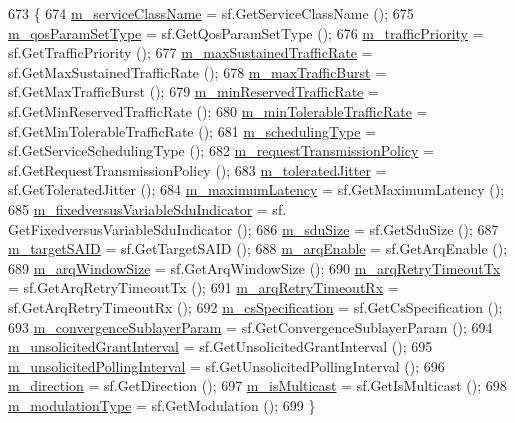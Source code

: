 \begin{DoxyCode}
673 \{
674   \hyperlink{classns3_1_1ServiceFlow_a1edc6872551d75cf65513464475539b1}{m\_serviceClassName} = sf.GetServiceClassName ();
675   \hyperlink{classns3_1_1ServiceFlow_a76222bd599cc4e27578bafba5304d158}{m\_qosParamSetType} = sf.GetQosParamSetType ();
676   \hyperlink{classns3_1_1ServiceFlow_a536ed647361dd0cc432aec5b4a6d661a}{m\_trafficPriority} = sf.GetTrafficPriority ();
677   \hyperlink{classns3_1_1ServiceFlow_a604d5dcda6dbb58528799cf439584ecb}{m\_maxSustainedTrafficRate} = sf.GetMaxSustainedTrafficRate ();
678   \hyperlink{classns3_1_1ServiceFlow_a6d99ed08420605f4f56188eced87ccd0}{m\_maxTrafficBurst} = sf.GetMaxTrafficBurst ();
679   \hyperlink{classns3_1_1ServiceFlow_a54dc771349ed7d93631e4a44299838d7}{m\_minReservedTrafficRate} = sf.GetMinReservedTrafficRate ();
680   \hyperlink{classns3_1_1ServiceFlow_a3b8d632776a81daa9306c1e976685aee}{m\_minTolerableTrafficRate} = sf.GetMinTolerableTrafficRate ();
681   \hyperlink{classns3_1_1ServiceFlow_a2d3227119fefd7969d145645cdb693af}{m\_schedulingType} = sf.GetServiceSchedulingType ();
682   \hyperlink{classns3_1_1ServiceFlow_a019520fe5d683d8c79465830166815ce}{m\_requestTransmissionPolicy} = sf.GetRequestTransmissionPolicy ();
683   \hyperlink{classns3_1_1ServiceFlow_a225bda97e6281ab2c5a5d1b9682bf21b}{m\_toleratedJitter} = sf.GetToleratedJitter ();
684   \hyperlink{classns3_1_1ServiceFlow_a3b511a39a2dc94f5649b127c9e7a2073}{m\_maximumLatency} = sf.GetMaximumLatency ();
685   \hyperlink{classns3_1_1ServiceFlow_abcc372b51b2b646d66af51fb2231a183}{m\_fixedversusVariableSduIndicator} = sf.
      GetFixedversusVariableSduIndicator ();
686   \hyperlink{classns3_1_1ServiceFlow_ac6e5539e9c678970045eb8fe247903e6}{m\_sduSize} = sf.GetSduSize ();
687   \hyperlink{classns3_1_1ServiceFlow_a0155ea4031007c532c4a206561ec8835}{m\_targetSAID} = sf.GetTargetSAID ();
688   \hyperlink{classns3_1_1ServiceFlow_abbea8cd5abb577970a936459f71f4c07}{m\_arqEnable} = sf.GetArqEnable ();
689   \hyperlink{classns3_1_1ServiceFlow_ab160ff007191a43ea79a77d7da31d1cf}{m\_arqWindowSize} = sf.GetArqWindowSize ();
690   \hyperlink{classns3_1_1ServiceFlow_a4ec13b36ebe74498e5556ad162f001f0}{m\_arqRetryTimeoutTx} = sf.GetArqRetryTimeoutTx ();
691   \hyperlink{classns3_1_1ServiceFlow_acdaa53c3298bc50b58a06b30dabb33d2}{m\_arqRetryTimeoutRx} = sf.GetArqRetryTimeoutRx ();
692   \hyperlink{classns3_1_1ServiceFlow_a17884a9cb0e15543e8d96f8241b680ae}{m\_csSpecification} = sf.GetCsSpecification ();
693   \hyperlink{classns3_1_1ServiceFlow_a4add395bf3ab6259353e62227a88d04c}{m\_convergenceSublayerParam} = sf.GetConvergenceSublayerParam ();
694   \hyperlink{classns3_1_1ServiceFlow_a45c54537e6acf68f34a1c3b2f61cefa2}{m\_unsolicitedGrantInterval} = sf.GetUnsolicitedGrantInterval ();
695   \hyperlink{classns3_1_1ServiceFlow_a757b8a5d3178773cecb45ba00053207e}{m\_unsolicitedPollingInterval} = sf.GetUnsolicitedPollingInterval ();
696   \hyperlink{classns3_1_1ServiceFlow_aeadd654a7d1e5e6c64b6702fecc289dd}{m\_direction} = sf.GetDirection ();
697   \hyperlink{classns3_1_1ServiceFlow_a8cdd6fb9780b799ef623c3a6dc8e127d}{m\_isMulticast} = sf.GetIsMulticast ();
698   \hyperlink{classns3_1_1ServiceFlow_a0f223bac27e2db3d1508611d48379587}{m\_modulationType} = sf.GetModulation ();
699 \}
\end{DoxyCode}



